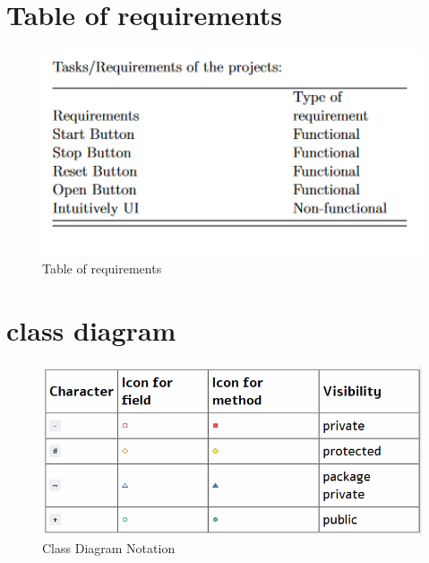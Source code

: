 \section{Table of requirements}
\begin{figure}
\centering
\includegraphics[width=4.5in]{images/taskreqir.png}
\caption{Table of requirements}
\end{figure}

\section{class diagram}
\begin{figure}
\centering
\includegraphics[width=4.5in]{images/image5.png}
\caption{Class Diagram Notation}
\end{figure}


